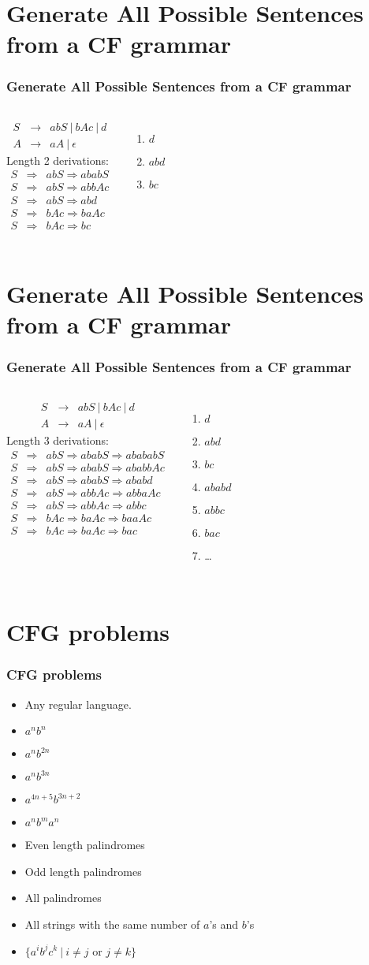 \documentclass{beamer}
\newcommand{\arr}{&\rightarrow&}
\newcommand{\darr}{&\Rightarrow&}
\newcommand{\dar}{\Rightarrow}
\newcommand{\bee}{\begin{eqnarray*}}
\newcommand{\eee}{\end{eqnarray*}}
\newcommand{\emptystring}{\ensuremath{\epsilon}}
\newcommand{\bi}{\begin{itemize}}
\newcommand{\li}{\item}
\newcommand{\ei}{\end{itemize}}
\newcommand{\sect}[1]{
\section{#1}
\begin{frame}[fragile]\frametitle{#1}
}
\begin{document}
\sect{Generate All Possible Sentences from a CF grammar}
\begin{columns}
\bee
S \arr abS \ | \ bAc \ | \ d\\
A \arr aA \ | \ \emptystring
\eee
{}
Length 2 derivations:
\bee
S \darr abS \dar ababS\\
S \darr abS \dar abbAc\\
S \darr abS \dar abd\\
S \darr bAc \dar baAc\\
S \darr bAc \dar bc\\
\eee
{}
\begin{enumerate}
\item  $d$
\item $abd$
\item $bc$
\end{enumerate}
\end{columns}
\end{frame}

\sect{Generate All Possible Sentences from a CF grammar}
\begin{columns}
\bee
S \arr abS \ | \ bAc \ | \ d\\
A \arr aA \ | \ \emptystring
\eee
{}
Length 3 derivations:
\bee
S \darr abS \dar ababS \dar abababS\\
S \darr abS \dar ababS \dar ababbAc\\
S \darr abS \dar ababS \dar ababd\\
S \darr abS \dar abbAc \dar abbaAc\\
S \darr abS \dar abbAc \dar abbc\\
S \darr bAc \dar baAc \dar baaAc\\
S \darr bAc \dar baAc \dar bac\\
\eee
{}
\begin{enumerate}
\item  $d$
\item $abd$
\item $bc$
\item $ababd$
\item $abbc$
\item $bac$
\item \ldots
\end{enumerate}
\end{columns}
\end{frame}

\sect{CFG problems}
\bi
\li Any regular language.
\li $a^nb^n$
\li $a^nb^{2n}$
\li $a^nb^{3n}$
\li $a^{4n+5}b^{3n+2}$
\li $a^nb^ma^n$
\li Even length palindromes
\li Odd length palindromes
\li All palindromes
\li All strings with the same number of $a$'s and $b$'s
\li $\{a^ib^jc^k\ |\ i \not = j \mbox{~or~} j \not = k\}$
\ei
\end{frame}
\end{document}
